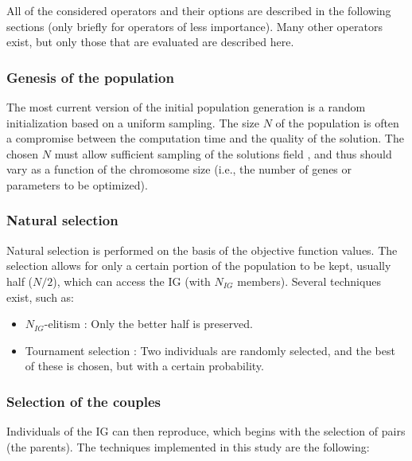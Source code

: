 \documentclass{ametsoc}
\begin{document}
All of the considered operators and their options are described in the following sections (only briefly for operators of less importance). Many other operators exist, but only those that are evaluated are described here.

\subsubsection{Genesis of the population}

The most current version of the initial population generation is a random initialization based on a uniform sampling. The size $N$ of the population is often a compromise between the computation time and the quality of the solution. The chosen $N$ must allow sufficient sampling of the solutions field \citep{Beasley1996a}, and thus should vary as a function of the chromosome size (i.e., the number of genes or parameters to be optimized). 


\subsubsection{Natural selection}
\label{sec:gas:nat_selection}

Natural selection is performed on the basis of the objective function values. The selection allows for only a certain portion of the population to be kept, usually half ($N/2$), which can access the IG (with $N_{IG}$ members). Several techniques exist, such as:

\begin{itemize}
	\item $N_{IG}$-elitism \citep{Michalewicz1996}: Only the better half is preserved. 
	
	\item Tournament selection \citep{Michalewicz1996, Zitzler2004a}: Two individuals are randomly selected, and the best of these is chosen, but with a certain probability.
\end{itemize}


\subsubsection{Selection of the couples}
\label{sec:gas:selection_couples}

Individuals of the IG can then reproduce, which begins with the selection of pairs (the parents). The techniques implemented in this study are the following:
\end{document}
